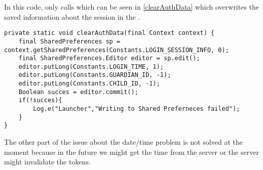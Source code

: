 In this code,  only calls  which can be
seen in \autoref{clearAuthData} which overwrites the saved information about the
session in the .\nl

\begin{minipage}[H]{\linewidth}
\begin{lstlisting}[caption = ClearAuthData methode, label = clearAuthData]
private static void clearAuthData(final Context context) {
    final SharedPreferences sp = context.getSharedPreferences(Constants.LOGIN_SESSION_INFO, 0);
    final SharedPreferences.Editor editor = sp.edit();
    editor.putLong(Constants.LOGIN_TIME, 1);
    editor.putLong(Constants.GUARDIAN_ID, -1);
    editor.putLong(Constants.CHILD_ID, -1);
    Boolean succes = editor.commit();
    if(!succes){
    	Log.e("Launcher","Writing to Shared Preferneces failed");
    }
}
\end{lstlisting} 
\end{minipage}

The other part of the issue about the date/time problem is not solved at the
moment because in the future we might get the time from the server or the server
might invalidate the tokens.

